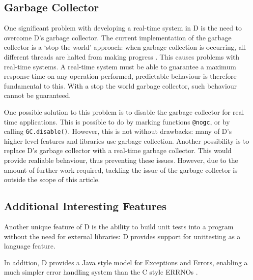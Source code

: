 \subsection{Garbage Collector}
One significant problem with developing a real-time system in D is the need to 
overcome D's garbage collector. The current implementation of the garbage 
collector is a `stop the world' approach: when garbage collection is occurring, 
all different threads are halted from making progress 
\cite{dlang-garbage}. This causes problems with 
real-time systems. A real-time system must be able to guarantee a maximum response 
time on any operation performed, predictable behaviour is therefore fundamental to this. 
With a stop the world garbage collector, such behaviour cannot be guaranteed. 
\par\bigskip\noindent
One possible solution to this problem is to disable the garbage collector for 
real time applications. This is possible to do by marking functions \texttt{@nogc}, 
or by calling \texttt{GC.disable()}. However, this is not without drawbacks: 
many of D's higher level features and libraries use garbage collection. 
Another possibility is to replace D's garbage collector with a real-time 
garbage collector. This would provide realiable behaviour, thus preventing these 
issues. However, 
due to the amount of further work required, tackling the issue of the garbage 
collector is outside the scope of this article.

\subsection{Additional Interesting Features}
Another unique feature of D is the ability to build unit tests into a 
program without the need for external libraries: D provides support for 
unittesting as a language feature. 
\par\bigskip\noindent
In addition, D provides a Java style model for Exceptions and Errors, enabling 
a much simpler error handling system than the C style ERRNOs 
\cite{ddili-book}. 
